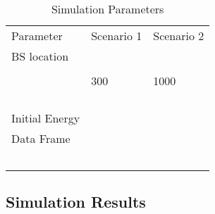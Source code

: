\documentclass[journal]{IEEEtran}
\begin{document}
\begin{table}[h]
\centering
\caption{Simulation Parameters}
\label{tab:1}       \begin{tabular}{l l l}
\hline\noalign{\smallskip}
Parameter & Scenario 1 & Scenario 2 \\
\noalign{\smallskip}\hline\noalign{\smallskip}
BS location &  & \\
 &  & \\
 & 300 & 1000\\
 &  & \\
 &  & \\
 &  & \\
 &  & \\
Initial Energy &  & \\
Data Frame &  & \\
 &  & \\
 &  & \\
 &  & \\
 &  & \\
\noalign{\smallskip}\hline
\end{tabular}
\end{table}


\subsection{Simulation Results}
\label{subsec:sim-res}
\end{document}
